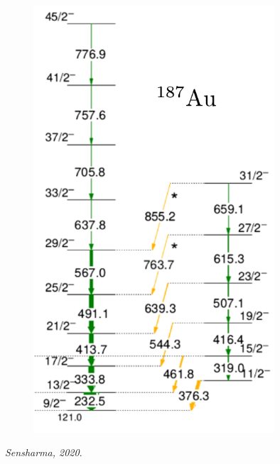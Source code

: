 \documentclass{beamer}
\begin{document}
\begin{frame}
\begin{columns}
\begin{column}{0.4\textwidth}
			\begin{figure}
				\centering
				\includegraphics[width=0.8\textwidth]{figures/au_187_spectra.pdf}
			\end{figure}
			\vspace{-0.4cm}
			\textit{Sensharma, 2020}.
		\end{column}
	\end{columns}
\end{frame}

\end{document}
